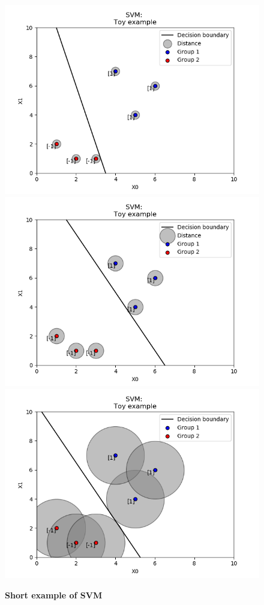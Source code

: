 \documentclass[a4paper,12pt]{article}
\numberwithin{equation}{section}
\begin{document}
\begin{figure}[H]%
    \begin{center}
    \includegraphics[scale = 0.5]{Figure1SVM.png}%
    \qquad
    \includegraphics[scale = 0.5]{Figure2SVM.png}%
    \qquad
    \includegraphics[scale = 0.5]{Figure3SVM.png}%
    \caption{\textbf{Short example of SVM}}%
    \label{fig:example}%
    \end{center}
\end{figure}
\end{document}
